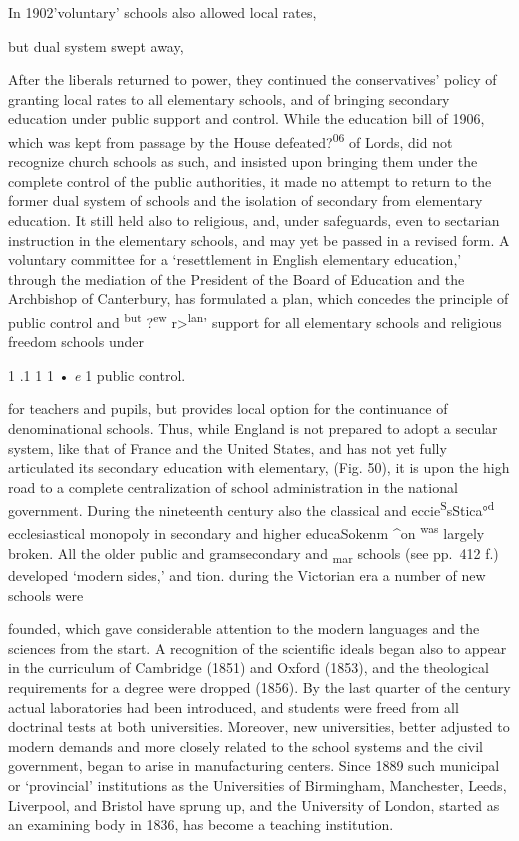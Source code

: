 \documentclass[
]{book}
\begin{document}
In 1902'voluntary' schools also allowed local rates,

but dual system swept away,

After the liberals returned to power, they continued the conservatives' policy of granting local rates to all elementary schools, and of bringing secondary education under public support and control. While the education bill of 1906, which was kept from passage by the House defeated?\textsuperscript{06} of Lords, did not recognize church schools as such, and insisted upon bringing them under the complete control of the public authorities, it made no attempt to return to the former dual system of schools and the isolation of secondary from elementary education. It still held also to religious, and, under safeguards, even to sectarian instruction in the elementary schools, and may yet be passed in a revised form. A voluntary committee for a `resettlement in English elementary education,' through the mediation of the President of the Board of Education and the Archbishop of Canterbury, has formulated a plan, which concedes the principle of public control and \textsuperscript{but} ?\textsuperscript{ew} r\textgreater{}\textsuperscript{lan}' support for all elementary schools and religious freedom schools under

1 .1 1 1 • \emph{e} 1 public control.

for teachers and pupils, but provides local option for the continuance of denominational schools. Thus, while England is not prepared to adopt a secular system, like that of France and the United States, and has not yet\protect\hypertarget{ch25.xmlux5cux23para.469.1.0.box.78.230.1265.476.q.50}{}{ fully articulated its secondary education with elementary, (Fig. 50), it is upon the high road to a complete centralization of school administration in the national government. During the nineteenth century also the classical and eccie\textsuperscript{S}sStica°\textsuperscript{d} ecclesiastical monopoly in secondary and higher educaSokenm \^{}on \textsuperscript{was} largely broken. All the older public and gramsecondary and \textsubscript{mar} schools (see pp.~412 f.) developed `modern sides,' and tion. during the Victorian era a number of new schools were}

founded, which gave considerable attention to the modern languages and the sciences from the start. A recognition of the scientific ideals began also to appear in the curriculum of Cambridge (1851) and Oxford (1853), and the theological requirements for a degree were dropped (1856). By the last quarter of the century actual laboratories had been introduced, and students were freed from all doctrinal tests at both universities. Moreover, new universities, better adjusted to modern demands and more closely related to the school systems and the civil government, began to arise in manufacturing centers. Since 1889 such municipal or `provincial' institutions as the Universities of Birmingham, Manchester, Leeds, Liverpool, and Bristol have sprung up, and the University of London, started as an examining body in 1836, has become a teaching institution.
\end{document}
